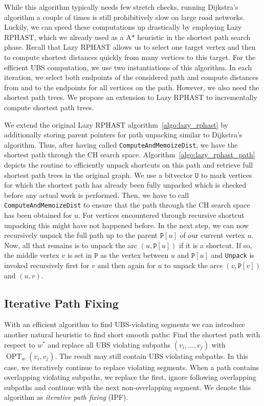 \documentclass[a4paper,UKenglish,cleveref, autoref, thm-restate]{lipics-v2021}
\newcommand*{\shp}{\operatorname{OPT}}
\begin{document}
While this algorithm typically needs few stretch checks, running Dijkstra's algorithm a couple of times is still prohibitively slow on large road networks.
Luckily, we can speed these computations up drastically by employing Lazy RPHAST, which we already used as a A* heuristic in the shortest path search phase.
Recall that Lazy RPHAST allows us to select one target vertex and then to compute shortest distances quickly from many vertices to this target.
For the efficient UBS computation, we use two instantiations of this algorithm.
In each iteration, we select both endpoints of the considered path and compute distances from and to the endpoints for all vertices on the path.
However, we also need the shortest path trees.
We propose an extension to Lazy RPHAST to incrementally compute shortest path trees.

We extend the original Lazy RPHAST algorithm~\ref{algo:lazy_rphast} by additionally storing parent pointers for path unpacking similar to Dijkstra's algorithm.
Thus, after having called \texttt{ComputeAndMemoizeDist}, we have the shortest path through the CH search space.
Algorithm~\ref{algo:lazy_rphast_path} depicts the routine to efficiently unpack shortcuts on this path and retrieve full shortest path trees in the original graph.
We use a bitvector $\mathtt{U}$ to mark vertices for which the shortest path has already been fully unpacked which is checked before any actual work is performed.
Then, we have to call \texttt{ComputeAndMemoizeDist} to ensure that the path through the CH search space has been obtained for $u$.
For vertices encountered through recursive shortcut unpacking this might have not happened before.
In the next step, we can now recursively unpack the full path up to the parent $\mathtt{P}[u]$ of our current vertex $u$.
Now, all that remains is to unpack the arc $(u, \mathtt{P}[u])$ if it is a shortcut.
If so, the middle vertex $v$ is set in $\mathtt{P}$ as the vertex between $u$ and $\mathtt{P}[u]$ and \texttt{Unpack} is invoked recursively first for $v$ and then again for $u$ to unpack the arcs $(v, \mathtt{P}[v])$ and $(u,v)$.

\subsection{Iterative Path Fixing}

With an efficient algorithm to find UBS-violating segments we can introduce another natural heuristic to find short smooth paths:
Find the shortest path with respect to $w^*$ and replace all UBS violating subpaths $(v_i,\dots,v_j)$ with $\shp_w(v_i, v_j)$.
The result may still contain UBS violating subpaths.
In this case, we iteratively continue to replace violating segments.
When a path contains overlapping violating subpaths, we replace the first, ignore following overlapping subpaths and continue with the next non-overlapping segment.
We denote this algorithm as \emph{iterative path fixing} (IPF).
\end{document}
